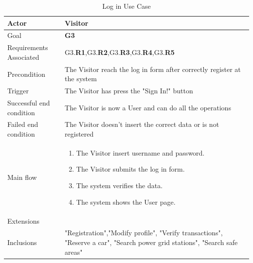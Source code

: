 \newline
\begin{table}[htb]
\begin{center}
\renewcommand{\arraystretch}{1.5}
\begin{tabular}{|l|p{}|}
\hline
Actor & Visitor \\ \hline
Goal & \textbf{G3} \\ \hline
Requirements Associated & G3.\textbf{R1},G3.\textbf{R2},G3.\textbf{R3},G3.\textbf{R4},G3.\textbf{R5} \\ \hline
Precondition & The Visitor reach the log in form after correctly register at the system \\ \hline
Trigger & The Visitor has press the "Sign In!" button \\ \hline
Successful end condition & The Visitor is now a User and can do all the operations \\ \hline
Failed end condition & The Visitor doesn't insert the correct data or is not registered \\ \hline
Main flow & \begin{minipage}[t]{0.6\textwidth}
\begin{enumerate}
\addtolength{\itemindent}{0.5cm}
\item The Visitor insert username and password.
\item The Visitor submits the log in form.
\item The system verifies the data.
\item The system shows the User page.
\end{enumerate}
\end{minipage} \\ \hline
Extensions & \\ \hline
Inclusions & "Registration","Modify profile", "Verify transactions", "Reserve a car", "Search power grid stations", "Search safe areas"  \\ \hline
\end{tabular}
\caption{Log in Use Case}
\end{center}
\end{table}
\clearpage

